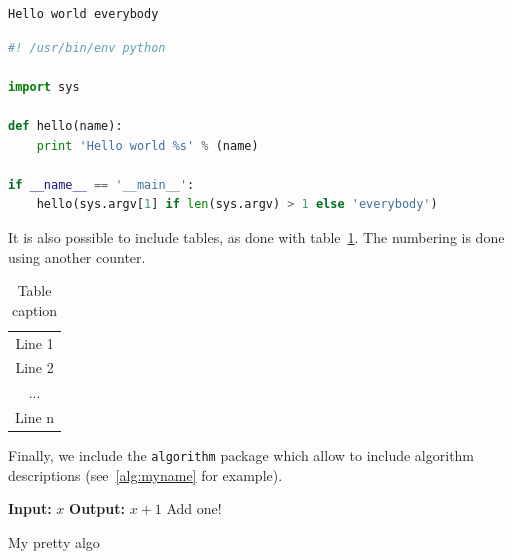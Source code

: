 \begin{lstlisting}[language={},caption={Standard output},label={lst:myname:outhello}]
Hello world everybody
\end{lstlisting}

\begin{lstlisting}[language={Python},caption={My first program},label={lst:myname:helloword}]
#! /usr/bin/env python

import sys

def hello(name):
    print 'Hello world %s' % (name)

if __name__ == '__main__':
    hello(sys.argv[1] if len(sys.argv) > 1 else 'everybody')
\end{lstlisting}


It is also possible to include tables, as done with
table~\ref{tbl:myname}. The numbering is done using another counter.

\begin{table}[ht]
  \centering
  \begin{tabular}{|c|}
  \hline
  Line 1 \\
  Line 2 \\
  ... \\
  Line n \\
  \hline
  \end{tabular}
  \caption{Table caption}
  \label{tbl:myname}
\end{table}


Finally, we include the \texttt{algorithm} package which allow to
include algorithm descriptions (see~\ref{alg:myname} for example).

\begin{algorithm}
\begin{algorithmic}[1]
  \Statex \textbf{Input:} $x$
  \Statex \textbf{Output:} $x+1$
  \State Add one!
\end{algorithmic}
\caption{My pretty algo}\label{alg:myname}
\end{algorithm}



%
%
